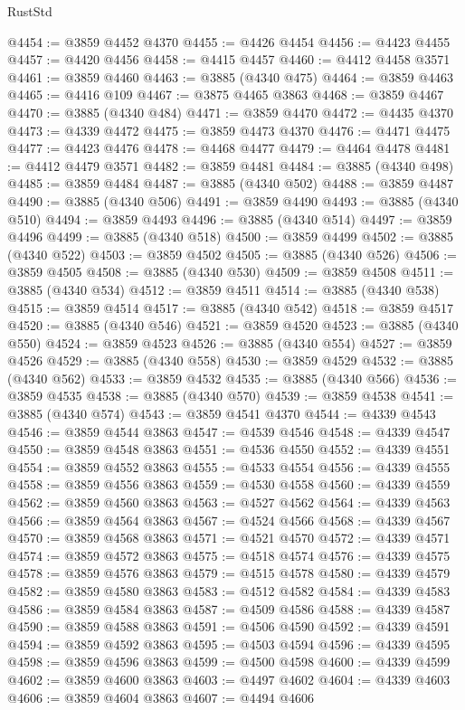 \begin{lexlean}{RustStd}
\begin{coremodule}
@4454 := @3859 @4452 @4370
@4455 := @4426 @4454
@4456 := @4423 @4455
@4457 := @4420 @4456
@4458 := @4415 @4457
@4460 := @4412 @4458 @3571
@4461 := @3859 @4460
@4463 := @3885 (@4340 @475)
@4464 := @3859 @4463
@4465 := @4416 @109
@4467 := @3875 @4465 @3863
@4468 := @3859 @4467
@4470 := @3885 (@4340 @484)
@4471 := @3859 @4470
@4472 := @4435 @4370
@4473 := @4339 @4472
@4475 := @3859 @4473 @4370
@4476 := @4471 @4475
@4477 := @4423 @4476
@4478 := @4468 @4477
@4479 := @4464 @4478
@4481 := @4412 @4479 @3571
@4482 := @3859 @4481
@4484 := @3885 (@4340 @498)
@4485 := @3859 @4484
@4487 := @3885 (@4340 @502)
@4488 := @3859 @4487
@4490 := @3885 (@4340 @506)
@4491 := @3859 @4490
@4493 := @3885 (@4340 @510)
@4494 := @3859 @4493
@4496 := @3885 (@4340 @514)
@4497 := @3859 @4496
@4499 := @3885 (@4340 @518)
@4500 := @3859 @4499
@4502 := @3885 (@4340 @522)
@4503 := @3859 @4502
@4505 := @3885 (@4340 @526)
@4506 := @3859 @4505
@4508 := @3885 (@4340 @530)
@4509 := @3859 @4508
@4511 := @3885 (@4340 @534)
@4512 := @3859 @4511
@4514 := @3885 (@4340 @538)
@4515 := @3859 @4514
@4517 := @3885 (@4340 @542)
@4518 := @3859 @4517
@4520 := @3885 (@4340 @546)
@4521 := @3859 @4520
@4523 := @3885 (@4340 @550)
@4524 := @3859 @4523
@4526 := @3885 (@4340 @554)
@4527 := @3859 @4526
@4529 := @3885 (@4340 @558)
@4530 := @3859 @4529
@4532 := @3885 (@4340 @562)
@4533 := @3859 @4532
@4535 := @3885 (@4340 @566)
@4536 := @3859 @4535
@4538 := @3885 (@4340 @570)
@4539 := @3859 @4538
@4541 := @3885 (@4340 @574)
@4543 := @3859 @4541 @4370
@4544 := @4339 @4543
@4546 := @3859 @4544 @3863
@4547 := @4539 @4546
@4548 := @4339 @4547
@4550 := @3859 @4548 @3863
@4551 := @4536 @4550
@4552 := @4339 @4551
@4554 := @3859 @4552 @3863
@4555 := @4533 @4554
@4556 := @4339 @4555
@4558 := @3859 @4556 @3863
@4559 := @4530 @4558
@4560 := @4339 @4559
@4562 := @3859 @4560 @3863
@4563 := @4527 @4562
@4564 := @4339 @4563
@4566 := @3859 @4564 @3863
@4567 := @4524 @4566
@4568 := @4339 @4567
@4570 := @3859 @4568 @3863
@4571 := @4521 @4570
@4572 := @4339 @4571
@4574 := @3859 @4572 @3863
@4575 := @4518 @4574
@4576 := @4339 @4575
@4578 := @3859 @4576 @3863
@4579 := @4515 @4578
@4580 := @4339 @4579
@4582 := @3859 @4580 @3863
@4583 := @4512 @4582
@4584 := @4339 @4583
@4586 := @3859 @4584 @3863
@4587 := @4509 @4586
@4588 := @4339 @4587
@4590 := @3859 @4588 @3863
@4591 := @4506 @4590
@4592 := @4339 @4591
@4594 := @3859 @4592 @3863
@4595 := @4503 @4594
@4596 := @4339 @4595
@4598 := @3859 @4596 @3863
@4599 := @4500 @4598
@4600 := @4339 @4599
@4602 := @3859 @4600 @3863
@4603 := @4497 @4602
@4604 := @4339 @4603
@4606 := @3859 @4604 @3863
@4607 := @4494 @4606

\end{coremodule}
\end{lexlean}

